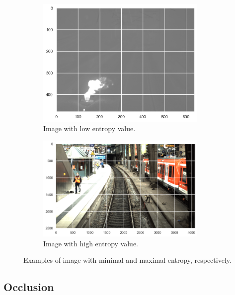 \documentclass[Master,MDS,english]{BASE/twbook} %
\begin{document}
\begin{figure}
\centering
\begin{subfigure}[t]{.5\textwidth}
  \centering
  \includegraphics[width=0.9\textwidth]{images/datasets/db/low_entropy}
  \caption{Image with low entropy value.}
  \label{fig:entropy_sub1}
\end{subfigure}%
\begin{subfigure}[t]{.5\textwidth}
  \centering
  \includegraphics[width=0.9\textwidth]{images/datasets/db/high_entropy}
  \caption{Image with high entropy value.}
 \label{fig:entropy_sub2}
\end{subfigure}
\caption{Examples of image with minimal and maximal entropy, respectively.}
\label{fig:entropy_examples}
\end{figure}


\subsection{Occlusion}
\end{document}
